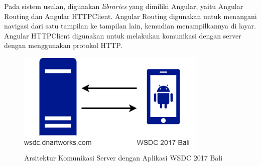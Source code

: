 Pada sistem usulan, digunakan \textit{libraries} yang dimiliki Angular, yaitu Angular Routing dan Angular HTTPClient. Angular Routing digunakan untuk menangani navigasi dari satu tampilan ke tampilan lain, kemudian menampilkannya di layar.  Angular HTTPClient digunakan untuk melakukan komunikasi dengan server dengan menggunakan protokol HTTP.

\begin{figure}[H]
		\centering
	    \includegraphics[scale=0.5]{Gambar/httpclientserver.png}
	    \caption{Arsitektur Komunikasi Server dengan Aplikasi WSDC 2017 Bali}
	    \label{fig:arsitekturhttpclient}
\end{figure}

